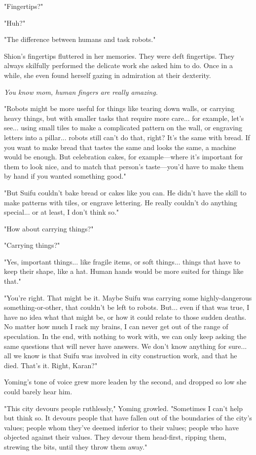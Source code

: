 "Fingertips?"

"Huh?"

"The difference between humans and task robots."

Shion's fingertips fluttered in her memories. They were deft fingertips.
They always skilfully performed the delicate work she asked him to do.
Once in a while, she even found herself gazing in admiration at their
dexterity.

\emph{You know mom, human fingers are really amazing.}

"Robots might be more useful for things like tearing down walls, or
carrying heavy things, but with smaller tasks that require more care...
for example, let's see... using small tiles to make a complicated
pattern on the wall, or engraving letters into a pillar... robots still
can't do that, right? It's the same with bread. If you want to make
bread that tastes the same and looks the same, a machine would be
enough. But celebration cakes, for example---where it's important for them
to look nice, and to match that person's taste---you'd have to make them
by hand if you wanted something good."

"But Suifu couldn't bake bread or cakes like you can. He didn't have the
skill to make patterns with tiles, or engrave lettering. He really
couldn't do anything special... or at least, I don't think so."

"How about carrying things?"

"Carrying things?"

"Yes, important things... like fragile items, or soft things... things
that have to keep their shape, like a hat. Human hands would be more
suited for things like that."

"You're right. That might be it. Maybe Suifu was carrying some
highly-dangerous something-or-other, that couldn't be left to robots.
But... even if that was true, I have no idea what that might be, or how
it could relate to those sudden deaths. No matter how much I rack my
brains, I can never get out of the range of speculation. In the end,
with nothing to work with, we can only keep asking the same questions
that will never have answers. We don't know anything for sure... all we
know is that Suifu was involved in city construction work, and that he
died. That's it. Right, Karan?"

Yoming's tone of voice grew more leaden by the second, and dropped so
low she could barely hear him.

"This city devours people ruthlessly," Yoming growled. "Sometimes I
can't help but think so. It devours people that have fallen out of the
boundaries of the city's values; people whom they've deemed inferior to
their values; people who have objected against their values. They devour
them head-first, ripping them, strewing the bits, until they throw them
away."

